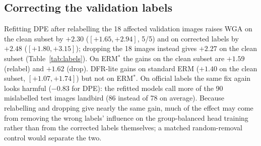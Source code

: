 \begin{table}[t]
\centering\small
\caption{Fixed-setting aggregators of the exploratory study (heads on 720 images, aggregator on 479): test WGA difference (pp, official labels) against the matched uniform ensemble and against full-validation DPE (saved heads, 89.60\%) on three partitions. Standard ERM, mean over five backbones; ERM$^*$: mean over partitions and two backbones.}
\label{tab:agg}
\end{table}

\subsection{Correcting the validation labels}
Refitting DPE after relabelling the 18 affected validation images raises WGA on the clean subset by $+2.30$\pp{} ($[+1.65,+2.94]$, 5/5) and on corrected labels by $+2.48$\pp{} ($[+1.80,+3.15]$); dropping the 18 images instead gives $+2.27$\pp{} on the clean subset (Table~\ref{tab:labels}). On ERM$^*$ the gains on the clean subset are $+1.59$ (relabel) and $+1.62$\pp{} (drop). DFR-lite gains on standard ERM ($+1.40$\pp{} on the clean subset, $[+1.07,+1.74]$) but not on ERM$^*$. On official labels the same fix again looks harmful ($-0.83$\pp{} for DPE): the refitted models call more of the 90 mislabelled test images landbird (86 instead of 78 on average). Because relabelling and dropping give nearly the same gain, much of the effect may come from removing the wrong labels' influence on the group-balanced head training rather than from the corrected labels themselves; a matched random-removal control would separate the two.

